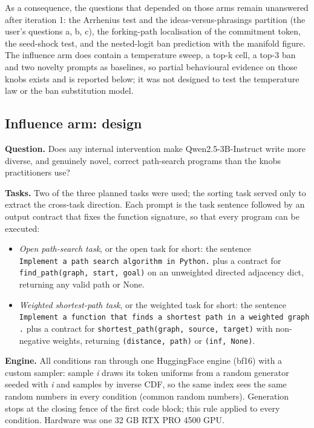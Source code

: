 \documentclass[11pt,letterpaper]{article}
\begin{document}
As a consequence, the questions that depended on those arms remain unanswered after iteration 1: the Arrhenius test and the ideas-versus-phrasings partition (the user's questions a, b, c), the forking-path localisation of the commitment token, the seed-shock test, and the nested-logit ban prediction with the manifold figure. The influence arm does contain a temperature sweep, a top-k cell, a top-3 ban and two novelty prompts as baselines, so partial behavioural evidence on those knobs exists and is reported below; it was not designed to test the temperature law or the ban substitution model.

\subsection{Influence arm: design}
\textbf{Question.} Does any internal intervention make Qwen2.5-3B-Instruct write more diverse, and genuinely novel, correct path-search programs than the knobs practitioners use?

\textbf{Tasks.} Two of the three planned tasks were used; the sorting task served only to extract the cross-task direction. Each prompt is the task sentence followed by an output contract that fixes the function signature, so that every program can be executed:

\begin{itemize}
\item \emph{Open path-search task}, or the open task for short: the sentence \texttt{Implement\ a\ path\ search\ algorithm\ in\ Python.} plus a contract for \texttt{find\_\allowbreak{}path(graph,\ start,\ goal)} on an unweighted directed adjacency dict, returning any valid path or None.
\item \emph{Weighted shortest-path task}, or the weighted task for short: the sentence \texttt{Implement\ a\ function\ that\ finds\ a\ shortest\ path\ in\ a\ weighted\ graph.} plus a contract for \texttt{shortest\_\allowbreak{}path(graph,\ source,\ target)} with non-negative weights, returning \texttt{(distance,\ path)} or \texttt{(inf,\ None)}.
\end{itemize}
\textbf{Engine.} All conditions ran through one HuggingFace engine (bf16) with a custom sampler: sample \emph{i} draws its token uniforms from a random generator seeded with \emph{i} and samples by inverse CDF, so the same index sees the same random numbers in every condition (common random numbers). Generation stops at the closing fence of the first code block; this rule applied to every condition. Hardware was one 32 GB RTX PRO 4500 GPU.
\end{document}
